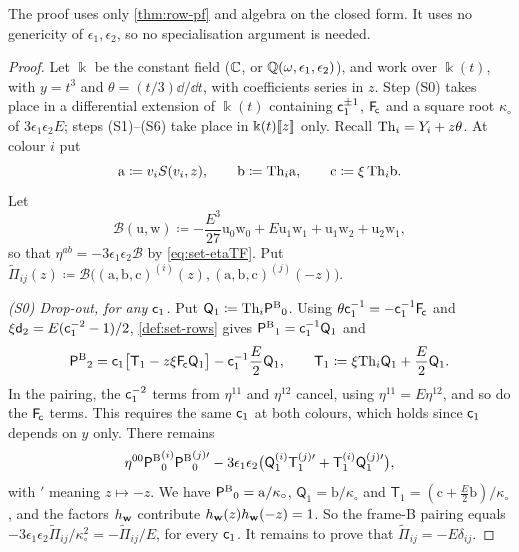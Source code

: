 The proof uses only \cref{thm:row-pf} and algebra on the closed form. It uses no genericity of $\epsilon_1,\epsilon_2$, so no specialisation argument is needed.

\begin{proof}
Let $\Bbbk$ be the constant field ($\mathbb{C}$, or $\mathbb{Q}(\omega,\epsilon_1,\epsilon_2)$), and work over $\Bbbk(t)$, with $y=t^3$ and $\theta=(t/3)\dd/\dd t$, with coefficients series in $z$. Step (S0) takes place in a differential extension of $\Bbbk(t)$ containing $\mathsf{c}_{1}^{\pm1}$, $\mathsf{F}_{\!\mathsf{c}}$ and a square root $\kappa_\circ$ of $3\epsilon_1\epsilon_2E$; steps (S1)--(S6) take place in $\Bbbk(t)[\![ z ]\!]$ only. Recall $\mathrm{Th}_i=Y_i+z\theta$. At colour $i$ put
\[
\mathrm{a}\coloneqq v_iS(v_i,z),\qquad\mathrm{b}\coloneqq\mathrm{Th}_i\mathrm{a},\qquad\mathrm{c}\coloneqq\xi\,\mathrm{Th}_i\mathrm{b}.
\]
Let
\[
\mathscr{B}(\mathrm{u},\mathrm{w})\coloneqq-\frac{E^3}{27}\mathrm{u}_0\mathrm{w}_0+E\mathrm{u}_1\mathrm{w}_1+\mathrm{u}_1\mathrm{w}_2+\mathrm{u}_2\mathrm{w}_1,
\]
so that $\eta^{ab}=-3\epsilon_1\epsilon_2\mathscr{B}$ by \eqref{eq:set-etaTF}. Put $\widetilde\Pi_{ij}(z)\coloneqq\mathscr{B}\big((\mathrm{a},\mathrm{b},\mathrm{c})^{(i)}(z),(\mathrm{a},\mathrm{b},\mathrm{c})^{(j)}(-z)\big)$.

\emph{(S0) Drop-out, for any $\mathsf{c}_{1}$.} Put $\mathsf{Q}_1\coloneqq\mathrm{Th}_i{\mathsf{P}^{\mathrm{B}}}_0$. Using $\theta\mathsf{c}_{1}^{-1}=-\mathsf{c}_{1}^{-1}\mathsf{F}_{\!\mathsf{c}}$ and $\xi\mathsf{d}_{2}=E(\mathsf{c}_{1}^{-2}-1)/2$, \cref{def:set-rows} gives ${\mathsf{P}^{\mathrm{B}}}_1=\mathsf{c}_{1}^{-1}\mathsf{Q}_1$ and
\[
{\mathsf{P}^{\mathrm{B}}}_2=\mathsf{c}_{1}\big[\mathsf{T}_1-z\xi\mathsf{F}_{\!\mathsf{c}}\mathsf{Q}_1\big]-\mathsf{c}_{1}^{-1}\frac E2\mathsf{Q}_1,\qquad\mathsf{T}_1\coloneqq\xi\mathrm{Th}_i\mathsf{Q}_1+\frac E2\mathsf{Q}_1.
\]
In the pairing, the $\mathsf{c}_{1}^{-2}$ terms from $\eta^{11}$ and $\eta^{12}$ cancel, using $\eta^{11}=E\eta^{12}$, and so do the $\mathsf{F}_{\!\mathsf{c}}$ terms. This requires the same $\mathsf{c}_{1}$ at both colours, which holds since $\mathsf{c}_{1}$ depends on $y$ only. There remains
\[
\eta^{00}{\mathsf{P}^{\mathrm{B}}}_0^{(i)}{\mathsf{P}^{\mathrm{B}}}_0^{(j)\prime}-3\epsilon_1\epsilon_2\big(\mathsf{Q}_1^{(i)}\mathsf{T}_1^{(j)\prime}+\mathsf{T}_1^{(i)}\mathsf{Q}_1^{(j)\prime}\big),
\]
with $'$ meaning $z\mapsto-z$. We have ${\mathsf{P}^{\mathrm{B}}}_0=\mathrm{a}/\kappa_\circ$, $\mathsf{Q}_1=\mathrm{b}/\kappa_\circ$ and $\mathsf{T}_1=(\mathrm{c}+\frac E2\mathrm{b})/\kappa_\circ$, and the factors $h_{\mathbf{w}}$ contribute $h_{\mathbf{w}}(z)h_{\mathbf{w}}(-z)=1$. So the frame-B pairing equals $-3\epsilon_1\epsilon_2\widetilde\Pi_{ij}/\kappa_\circ^2=-\widetilde\Pi_{ij}/E$, for every $\mathsf{c}_{1}$. It remains to prove that $\widetilde\Pi_{ij}=-E\delta_{ij}$.


\end{proof}
